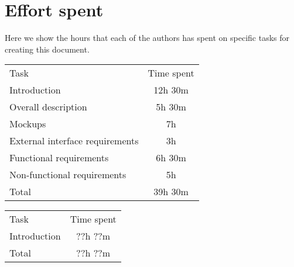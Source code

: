 \chapter{Effort spent}
Here we show the hours that each of the authors has spent on specific tasks
for creating this document.

\vspace{\baselineskip}\noindent
{
    \sffamily
    \begin{tabu} to \linewidth {l c}
        \rowfont{\bfseries}
         \\
        \toprule
        \rowfont{\bfseries}
        Task & Time spent \\
        \midrule
        Introduction & 12h 30m \\
        Overall description & 5h 30m \\
        Mockups & 7h \\
        External interface requirements & 3h \\
        Functional requirements & 6h 30m \\
        Non-functional requirements & 5h \\
        \bottomrule
        \rowfont{\bfseries}
        Total & 39h 30m
    \end{tabu}
}

\vspace{\baselineskip}\noindent
{
    \sffamily
    \begin{tabu} to \linewidth {l c}
        \rowfont{\bfseries}
         \\
        \toprule
        \rowfont{\bfseries}
        Task & Time spent \\
        \midrule
        Introduction & ??h ??m \\
        \bottomrule
        \rowfont{\bfseries}
        Total & ??h ??m
    \end{tabu}
}